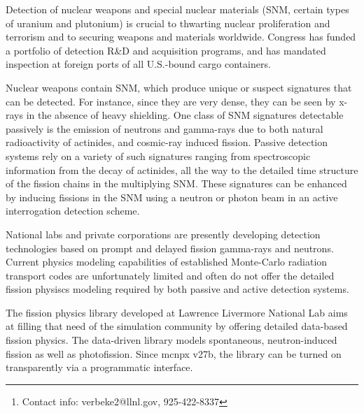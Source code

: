 \documentclass[fleqn,11pt]{article}
\date{May 11, 2009}
\author{
Jerome M. Verbeke\footnote{Contact info: verbeke2@llnl.gov, 925-422-8337}, Doug Wright\\}
\begin{document}
\maketitle



Detection of nuclear weapons and special nuclear materials (SNM, certain types of
uranium and plutonium) is crucial to thwarting nuclear proliferation and terrorism
and to securing weapons and materials worldwide. Congress has funded a portfolio
of detection R\&D and acquisition programs, and has mandated inspection at foreign
ports of all U.S.-bound cargo containers.

Nuclear weapons contain SNM, which produce unique or suspect signatures that
can be detected. For instance, since they are very dense, they can be seen by 
x-rays in the absence of heavy shielding. One class of SNM signatures detectable 
passively is the emission of neutrons and gamma-rays due to both natural 
radioactivity of actinides, and cosmic-ray induced fission. Passive detection 
systems rely on a variety of such signatures ranging from spectroscopic 
information from the decay of actinides, all the way to the detailed time 
structure of the fission chains in the multiplying SNM. These signatures can be 
enhanced by inducing fissions in the SNM using a neutron or photon beam in an 
active interrogation detection scheme.

National labs and private corporations are presently developing detection 
technologies based on prompt and delayed fission gamma-rays and neutrons. 
Current physics modeling capabilities of established Monte-Carlo radiation 
transport codes are unfortunately limited and often do not offer the detailed 
fission physiscs modeling required by both passive and active detection systems.

The fission physics library developed at Lawrence Livermore National Lab aims
at filling that need of the simulation community by offering detailed data-based 
fission physics. The data-driven library models spontaneous, neutron-induced 
fission as well as photofission. Since mcnpx v27b, the library can be turned on
transparently via a programmatic interface.


% 
\end{document}
